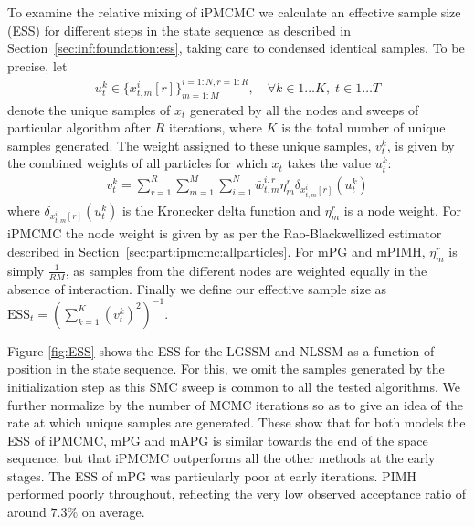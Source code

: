 To examine the relative mixing of iPMCMC we calculate an effective sample size (ESS) for different steps in the state 
sequence as described in Section~\ref{sec:inf:foundation:ess}, taking care to  condensed identical samples.  To be
precise, let
\begin{align*}
u_{t}^k \in \{x_{t,m}^{i}[r]\}^{i=1:N,r=1:R}_{m=1:M}, \quad \forall k \in 1 \dots K, \; t \in 1 \dots T
\end{align*} 
denote the unique samples of $x_t$ generated by all the nodes and sweeps of particular algorithm after $R$ iterations, where $K$ is the total number of unique samples generated.  The weight assigned to these unique samples, $v_t^{k}$, is given by the combined weights of all particles for which $x_t$ takes the value $u_{t}^k$:
\begin{align}
v_t^{k} = \sum_{r=1}^{R} \sum_{m=1}^{M} \sum_{i=1}^{N} \bar{w}_{t,m}^{i,r} \eta_{m}^{r} \delta_{x_{t,m}^{i}[r]}(u_{t}^{k})
\end{align}
where $\delta_{x_{t,m}^{i}[r]}(u_{t}^{k})$ is the Kronecker delta function and $\eta_{m}^{r}$ is a node weight.  For iPMCMC the node weight is given by as per the Rao-Blackwellized estimator described in Section~\ref{sec:part:ipmcmc:allparticles}. For mPG and mPIMH, $\eta_{m}^{r}$ is simply $\frac{1}{RM}$,
as samples from the different nodes are weighted equally in the absence of interaction. 
Finally we define our effective sample size as $\text{ESS}_t = \left(\textstyle\sum_{k=1}^K \left(v_t^{k}\right)^2\right)^{-1}$.

Figure \ref{fig:ESS} shows the ESS for the LGSSM and NLSSM as a function of position in the state sequence.  For this, we omit the samples generated by the initialization step as this SMC sweep is common to all the tested algorithms.  We further normalize by the number of MCMC iterations so as to give an idea of the rate at which unique samples are generated.  These show that for both models the ESS of iPMCMC, mPG and mAPG is similar towards the end of the space sequence, but that iPMCMC outperforms all the other methods at the early stages. The ESS of mPG was particularly poor at early iterations.  PIMH performed poorly throughout, reflecting the very low observed acceptance ratio of around $7.3\%$ on average. 

